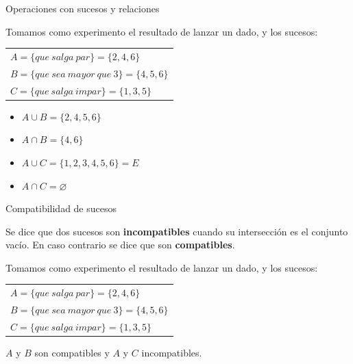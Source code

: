 \documentclass[11pt,handout]{beamer}
\begin{document}
\begin{frame}
{Operaciones con sucesos y relaciones}

 Tomamos como experimento el resultado de lanzar un dado, y los sucesos: \\
\begin{tabular}{l}
$A=\lbrace que\ salga\ par\rbrace=\lbrace2,4,6\rbrace$ \\
$B=\lbrace que\ sea\ mayor\ que\ 3\rbrace=\lbrace4,5,6\rbrace$ \\
$C=\lbrace que\ salga\ impar\rbrace=\lbrace1,3,5\rbrace$
\end{tabular}

\begin{itemize}	[<+->]
	\item $A\cup B=\lbrace2,4,5,6\rbrace$ \\
	\item $A\cap B=\lbrace4,6\rbrace$\\

	\item $A\cup C=\lbrace1,2,3,4,5,6\rbrace=E$
	\item $A\cap C=\varnothing$
\end{itemize}

\end{frame}


\begin{frame}{Compatibilidad de sucesos}
\begin{block}{}
Se dice que dos sucesos son \textbf{incompatibles} cuando su intersección es el conjunto vacío. En caso contrario se dice que son \textbf{compatibles}.
\end{block}

Tomamos como experimento el resultado de lanzar un dado, y los sucesos: \\
\begin{tabular}{l}
$A=\lbrace que\ salga\ par\rbrace=\lbrace2,4,6\rbrace$ \\
$B=\lbrace que\ sea\ mayor\ que\ 3\rbrace=\lbrace4,5,6\rbrace$ \\
$C=\lbrace que\ salga\ impar\rbrace=\lbrace1,3,5\rbrace$
\end{tabular}

$A$ y $B$ son compatibles y $A$ y $C$ incompatibles.

\end{frame}
\end{document}
